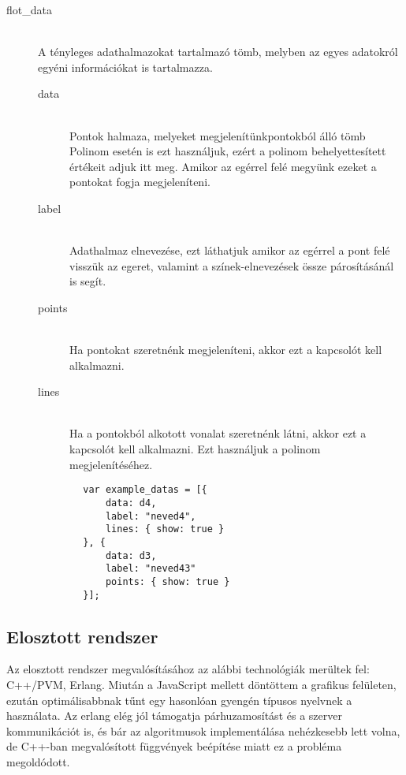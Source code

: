 \begin{description}
	 		\item[flot\_data] \hfill \\ 
	 		A tényleges adathalmazokat tartalmazó tömb, melyben az egyes adatokról egyéni információkat is tartalmazza.\newline
	 		\begin{description}
				\item[data] \hfill \\ 
				Pontok halmaza, melyeket megjelenítünk\newline
				[x, y] pontokból álló tömb\newline
				Polinom esetén is ezt használjuk, ezért a polinom behelyettesített értékeit adjuk itt meg. Amikor az egérrel felé megyünk ezeket a pontokat fogja megjeleníteni.
				\item[label] \hfill \\ 
				Adathalmaz elnevezése, ezt láthatjuk amikor az egérrel a pont felé visszük az egeret, valamint a színek-elnevezések össze párosításánál is segít.
				\item[points] \hfill \\ 
				Ha pontokat szeretnénk megjeleníteni, akkor ezt a kapcsolót kell alkalmazni.
				\item[lines] \hfill \\ 
				Ha a pontokból alkotott vonalat szeretnénk látni, akkor ezt a kapcsolót kell alkalmazni. Ezt használjuk a polinom megjelenítéséhez.
			\end{description}
	 		\begin{verbatim}
		var example_datas = [{
			data: d4,
			label: "neved4",
			lines: { show: true }
		}, {
		    data: d3,
			label: "neved43"
		    points: { show: true }
		}];
			\end{verbatim}
		\end{description}

\subsection{Elosztott rendszer}
	Az elosztott rendszer megvalósításához az alábbi technológiák merültek fel: C++/PVM, Erlang.
	Miután a JavaScript mellett döntöttem a grafikus felületen, ezután optimálisabbnak tűnt egy hasonlóan gyengén típusos nyelvnek a használata. Az erlang elég jól támogatja párhuzamosítást és a szerver kommunikációt is, és bár az algoritmusok implementálása nehézkesebb lett volna, de C++-ban megvalósított függvények beépítése miatt ez a probléma megoldódott.

